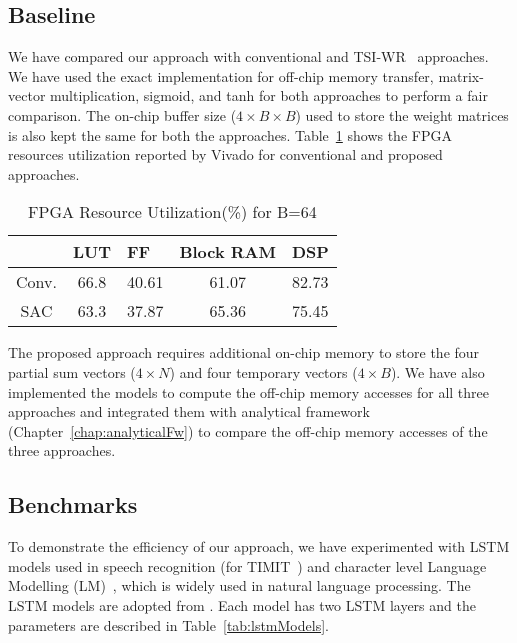 \subsection{Baseline}
We have compared our approach with conventional and TSI-WR~\cite{park2020time} approaches. We have used the exact implementation for off-chip memory transfer, matrix-vector multiplication, sigmoid, and tanh for both approaches to perform a fair comparison. The on-chip buffer size ($4{\times}B{\times}B$) used to store the weight matrices is also kept the same for both the approaches. Table~\ref{tab:fpgaResources} shows the FPGA resources utilization reported by Vivado for conventional and proposed approaches. 
\begin{table}[htb]
	\centering
	\caption{FPGA Resource Utilization(\%) for B=64}
	\label{tab:fpgaResources}
	\begin{tabular}{@{}ccccl@{}}
		\toprule
		\multicolumn{1}{l}{} & \multicolumn{1}{l}{LUT} & \multicolumn{1}{l}{FF} & \multicolumn{1}{l}{Block RAM} & DSP   \\ \midrule
		Conv.                & 66.8                    & 40.61                  & 61.07                         & 82.73 \\ \midrule
		SAC                  & 63.3                    & 37.87                  & 65.36                         & 75.45 \\ \bottomrule
	\end{tabular}
\end{table}
The proposed approach requires additional on-chip memory to store the four partial sum vectors ($4{\times}N$) and four temporary vectors ($4{\times}B$).  We have also implemented the models to compute the off-chip memory accesses for all three approaches and integrated them with analytical framework (Chapter~\ref{chap:analyticalFw}) to compare the off-chip memory accesses of the three approaches.
\subsection{Benchmarks}
To demonstrate the efficiency of our approach, we have experimented with LSTM models used in speech recognition (for TIMIT~\cite{garofolo1993timit}) and character level Language Modelling (LM)~\cite{sundermeyer2015feedforward}, which is widely used in natural language processing. The LSTM models are adopted from \cite{azari2020elsa,park2018maximizing,han2017ese}. Each model has two LSTM layers and the parameters are described in Table~\ref{tab:lstmModels}.

